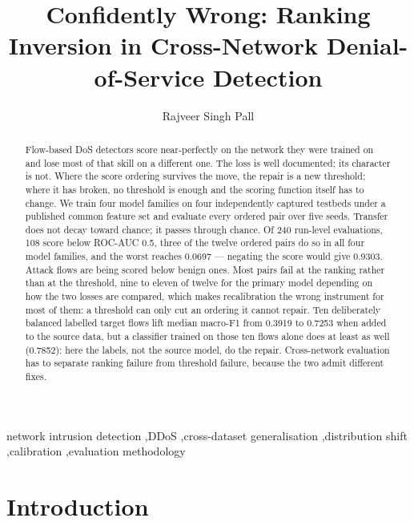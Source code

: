 \documentclass[preprint,12pt]{elsarticle}
\begin{document}
\begin{frontmatter}
\title{Confidently Wrong: Ranking Inversion in Cross-Network Denial-of-Service Detection}
\author{Rajveer Singh Pall}

\begin{abstract}
Flow-based DoS detectors score near-perfectly on the network they were trained on and lose most of that skill on a different one. The loss is well documented; its character is not. Where the score ordering survives the move, the repair is a new threshold; where it has broken, no threshold is enough and the scoring function itself has to change. We train four model families on four independently captured testbeds under a published common feature set and evaluate every ordered pair over five seeds. Transfer does not decay toward chance; it passes through chance. Of 240 run-level evaluations, 108 score below ROC-AUC 0.5, three of the twelve ordered pairs do so in all four model families, and the worst reaches 0.0697 --- negating the score would give 0.9303. Attack flows are being scored below benign ones. Most pairs fail at the ranking rather than at the threshold, nine to eleven of twelve for the primary model depending on how the two losses are compared, which makes recalibration the wrong instrument for most of them: a threshold can only cut an ordering it cannot repair. Ten deliberately balanced labelled target flows lift median macro-F1 from 0.3919 to 0.7253 when added to the source data, but a classifier trained on those ten flows alone does at least as well (0.7852): here the labels, not the source model, do the repair. Cross-network evaluation has to separate ranking failure from threshold failure, because the two admit different fixes.
\end{abstract}

\begin{keyword}
network intrusion detection \sep DDoS \sep cross-dataset generalisation \sep distribution shift \sep calibration \sep evaluation methodology
\end{keyword}
\end{frontmatter}



\section{Introduction}
\end{document}
